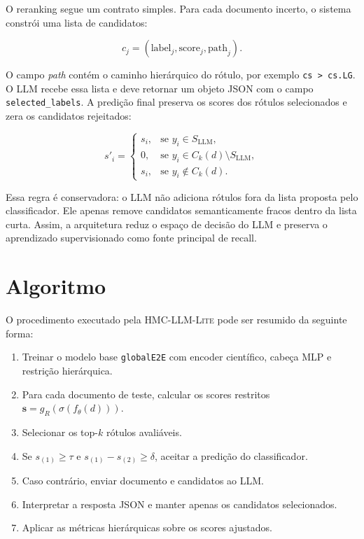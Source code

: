 \documentclass[11pt,a4paper]{article}
\newcommand{\method}{\textsc{HMC-LLM-Lite}}
\begin{document}
O reranking segue um contrato simples. Para cada documento incerto, o sistema
constrói uma lista de candidatos:

\begin{equation}
  c_j = (\text{label}_j, \text{score}_j, \text{path}_j).
\end{equation}

O campo \textit{path} contém o caminho hierárquico do rótulo, por exemplo
\texttt{cs > cs.LG}. O LLM recebe essa lista e deve retornar um objeto JSON com
o campo \texttt{selected\_labels}. A predição final preserva os scores dos
rótulos selecionados e zera os candidatos rejeitados:

\begin{equation}
  s'_i =
  \begin{cases}
    s_i, & \text{se } y_i \in S_{\mathrm{LLM}},\\
    0, & \text{se } y_i \in C_k(d) \setminus S_{\mathrm{LLM}},\\
    s_i, & \text{se } y_i \notin C_k(d).
  \end{cases}
\end{equation}

Essa regra é conservadora: o LLM não adiciona rótulos fora da lista proposta pelo
classificador. Ele apenas remove candidatos semanticamente fracos dentro da
lista curta. Assim, a arquitetura reduz o espaço de decisão do LLM e preserva o
aprendizado supervisionado como fonte principal de recall.

\section{Algoritmo}

O procedimento executado pela \method{} pode ser resumido da seguinte forma:

\begin{enumerate}[leftmargin=*, itemsep=3pt]
  \item Treinar o modelo base \texttt{globalE2E} com encoder científico,
        cabeça MLP e restrição hierárquica.
  \item Para cada documento de teste, calcular os scores restritos
        $\mathbf{s}=g_R(\sigma(f_\theta(d)))$.
  \item Selecionar os top-$k$ rótulos avaliáveis.
  \item Se $s_{(1)} \geq \tau$ e $s_{(1)} - s_{(2)} \geq \delta$, aceitar a
        predição do classificador.
  \item Caso contrário, enviar documento e candidatos ao LLM.
  \item Interpretar a resposta JSON e manter apenas os candidatos selecionados.
  \item Aplicar as métricas hierárquicas sobre os scores ajustados.
\end{enumerate}
\end{document}
